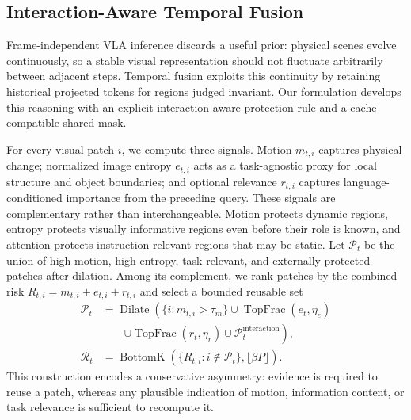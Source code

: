 \subsection{Interaction-Aware Temporal Fusion}
\label{sec:method_temporal_fusion}

Frame-independent VLA inference discards a useful prior: physical scenes evolve
continuously, so a stable visual representation should not fluctuate
arbitrarily between adjacent steps. Temporal fusion exploits this continuity by
retaining historical projected tokens for regions judged invariant. Our formulation develops this reasoning with
an explicit interaction-aware protection rule and a cache-compatible shared
mask.

For every visual patch $i$, we compute three signals. Motion $m_{t,i}$ captures
physical change; normalized image entropy $e_{t,i}$ acts as a task-agnostic
proxy for local structure and object boundaries; and optional relevance
$r_{t,i}$ captures language-conditioned importance from the preceding query.
These signals are complementary rather than interchangeable. Motion protects
dynamic regions, entropy protects visually informative regions even before
their role is known, and attention protects instruction-relevant regions that
may be static.
Let $\mathcal P_t$ be the union of high-motion, high-entropy, task-relevant,
and externally protected patches after dilation. Among its complement, we rank
patches by the combined risk $R_{t,i}=m_{t,i}+e_{t,i}+r_{t,i}$ and select a
bounded reusable set
\begin{equation}
\begin{aligned}
\mathcal P_t
&=\operatorname{Dilate}\!\left(
    \{i:m_{t,i}>\tau_m\}
    \cup \operatorname{TopFrac}(e_t,\eta_e)\right.\\
&\qquad\left.
    \cup \operatorname{TopFrac}(r_t,\eta_r)
    \cup \mathcal P_t^{\mathrm{interaction}}
    \right),\\
\mathcal R_t
&=\operatorname{BottomK}\!\left(
    \{R_{t,i}:i\notin\mathcal P_t\},
    \lfloor\beta P\rfloor
    \right).
\end{aligned}
\label{eq:interaction_selector}
\end{equation}
This construction encodes a conservative asymmetry: evidence is required to
reuse a patch, whereas any plausible indication of motion, information content,
or task relevance is sufficient to recompute it.

